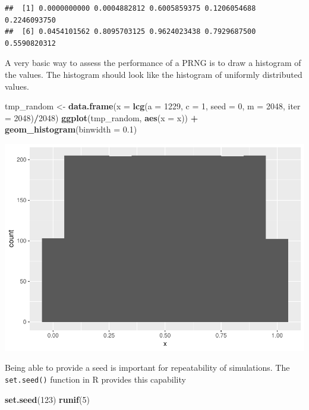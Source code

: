 \documentclass[]{article}
\newenvironment{Shaded}{\begin{snugshade}}{\end{snugshade}}
\newcommand{\KeywordTok}[1]{\textcolor[rgb]{0.13,0.29,0.53}{\textbf{#1}}}
\newcommand{\DataTypeTok}[1]{\textcolor[rgb]{0.13,0.29,0.53}{#1}}
\newcommand{\DecValTok}[1]{\textcolor[rgb]{0.00,0.00,0.81}{#1}}
\newcommand{\FloatTok}[1]{\textcolor[rgb]{0.00,0.00,0.81}{#1}}
\newcommand{\StringTok}[1]{\textcolor[rgb]{0.31,0.60,0.02}{#1}}
\newcommand{\OperatorTok}[1]{\textcolor[rgb]{0.81,0.36,0.00}{\textbf{#1}}}
\newcommand{\NormalTok}[1]{#1}
\begin{document}
\begin{verbatim}
##  [1] 0.0000000000 0.0004882812 0.6005859375 0.1206054688 0.2246093750
##  [6] 0.0454101562 0.8095703125 0.9624023438 0.7929687500 0.5590820312
\end{verbatim}

A very basic way to assess the performance of a PRNG is to draw a
histogram of the values. The histogram should look like the histogram of
uniformly distributed values.

\begin{Shaded}
\begin{Highlighting}[]
\NormalTok{tmp_random <-}\StringTok{ }\KeywordTok{data.frame}\NormalTok{(}\DataTypeTok{x =} \KeywordTok{lcg}\NormalTok{(}\DataTypeTok{a =} \DecValTok{1229}\NormalTok{, }\DataTypeTok{c =} \DecValTok{1}\NormalTok{, }\DataTypeTok{seed =} \DecValTok{0}\NormalTok{, }\DataTypeTok{m =} \DecValTok{2048}\NormalTok{, }\DataTypeTok{iter =} \DecValTok{2048}\NormalTok{)}\OperatorTok{/}\DecValTok{2048}\NormalTok{)}
\KeywordTok{ggplot}\NormalTok{(tmp_random, }\KeywordTok{aes}\NormalTok{(}\DataTypeTok{x =}\NormalTok{ x)) }\OperatorTok{+}\StringTok{ }\KeywordTok{geom_histogram}\NormalTok{(}\DataTypeTok{binwidth =} \FloatTok{0.1}\NormalTok{)}
\end{Highlighting}
\end{Shaded}

\includegraphics{stt-301-programming_files/figure-latex/unnamed-chunk-148-1.pdf}

Being able to provide a seed is important for repeatability of
simulations. The \texttt{set.seed()} function in R provides this
capability

\begin{Shaded}
\begin{Highlighting}[]
\KeywordTok{set.seed}\NormalTok{(}\DecValTok{123}\NormalTok{)}
\KeywordTok{runif}\NormalTok{(}\DecValTok{5}\NormalTok{)}
\end{Highlighting}
\end{Shaded}
\end{document}
